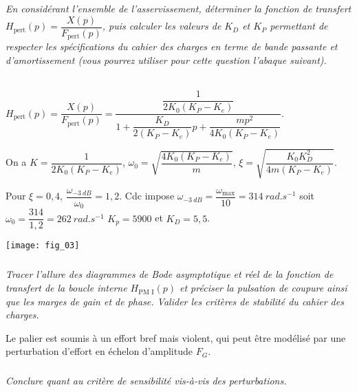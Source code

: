 \subparagraph{}\textit{En considérant l’ensemble de l’asservissement, déterminer la
fonction de transfert $H_{\text{pert}}(p) = \dfrac{X(p)}{F_{\text{pert}}(p)}$, puis calculer les valeurs de $K_D$ et $K_P$
permettant de respecter les spécifications du cahier des charges en terme de
bande passante et d’amortissement (vous pourrez utiliser pour cette question l’abaque suivant).}
\ifprof
\begin{corrige}~\\

$H_{\text{pert}}(p) = \dfrac{X(p)}{F_{\text{pert}}(p)} = \dfrac{\dfrac{1}{2K_0\left(K_P- K_e\right)}}{1+\dfrac{K_D}{2\left(K_P- K_e\right)}p+\dfrac{mp^2}{4K_0\left(K_P- K_e\right)}}$.

On a $K=\dfrac{1}{2K_0\left(K_P- K_e\right)}$, $\omega_0 = \sqrt{\dfrac{4K_0\left(K_P- K_e\right)}{m}}$, $\xi = \sqrt{\dfrac{K_0K_D^2}{4m\left(K_P - K_e\right)}}$. 

Pour $\xi=0,4$, $\dfrac{\omega_{\SI{-3}{dB}}}{\omega_0}=1,2$. Cdc impose $\omega_{\SI{-3}{dB}}=\dfrac{\omega_{\text{max}}}{10}=\SI{314}{rad.s^{-1}}$ soit $\omega_0 =\dfrac{314}{1,2}=\SI{262}{rad.s^{-1}}$ $K_p = 5900$ et $K_D = 5,5$.
\end{corrige}
\else
\fi

\begin{center}
\texttt{[image: fig\_03]}
\end{center}


\subparagraph{}\textit{Tracer l'allure des diagrammes de Bode asymptotique et réel de la fonction
de transfert de la boucle interne $H_{\text{PM I}}(p)$ et préciser la pulsation de coupure ainsi que les marges de gain et de phase. Valider les critères de stabilité du cahier des charges.}
\ifprof
\begin{corrige}

\end{corrige}
\else
\fi

Le palier est soumis à un effort bref mais violent, qui peut être modélisé par une perturbation d'effort en
échelon d'amplitude $F_G$.

\subparagraph{}\textit{Conclure quant au critère de sensibilité vis-à-vis des perturbations.}
\ifprof
\begin{corrige}

\end{corrige}
\else
\fi

